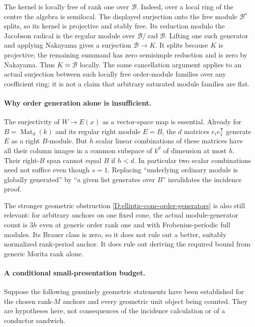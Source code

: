 The kernel is locally free of rank one over $\mathcal B$.  Indeed, over a
local ring of the centre the algebra is semilocal.  The displayed surjection
onto the free module $\mathcal B^s$ splits, so its kernel is projective and
stably free.  Its reduction modulo the Jacobson radical is the regular
module over $\mathcal B/\operatorname{rad}\mathcal B$.  Lifting one such
generator and applying Nakayama gives a surjection $\mathcal B\to K$.
It splits because $K$ is projective; the remaining summand has zero
semisimple reduction and is zero by Nakayama.  Thus $K\simeq\mathcal B$
locally.  The same cancellation argument applies to an actual surjection
between such locally free order-module families over any coefficient ring;
it is not a claim that arbitrary saturated module families are flat.

\paragraph{Why order generation alone is insufficient.}
The surjectivity of $W\to E(x)$ as a vector-space map is essential.  Already
for $B=\operatorname{Mat}_d(k)$ and its regular right module $E=B$, the
$d$ matrices $e_i e_1^{\mathsf T}$ generate $E$ as a right $B$-module.
But $h$ scalar linear combinations of these matrices have all their column
images in a common subspace of $k^d$ of dimension at most $h$.
Their right-$B$ span cannot equal $B$ if $h<d$.
In particular two scalar combinations need not suffice even though $s=1$.
Replacing ``underlying ordinary module is globally generated'' by
``a given list generates over $B$'' invalidates the incidence proof.

The stronger geometric obstruction
\ref{D:elliptic-cone-order-generators} is also still relevant: for arbitrary
anchors on one fixed cone, the actual module-generator count is $3h$ even
at generic order rank one and with Frobenius-periodic full modules.  Its
Brauer class is zero, so it does not rule out a better, suitably normalized
rank-period anchor.  It does rule out deriving the required bound from
generic Morita rank alone.

\paragraph{A conditional small-presentation budget.}
Suppose the following genuinely geometric statements have been established
for the chosen rank-$M$ anchors and every geometric unit object being
counted.  They are hypotheses here, not consequences of the incidence
calculation or of a conductor sandwich.

